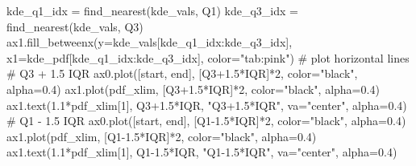 \documentclass[
  letterpaper,
  DIV=11,
  numbers=noendperiod,
  oneside]{scrreprt}
\newenvironment{Shaded}{\begin{snugshade}}{\end{snugshade}}
\newcommand{\CommentTok}[1]{\textcolor[rgb]{0.37,0.37,0.37}{#1}}
\newcommand{\DecValTok}[1]{\textcolor[rgb]{0.68,0.00,0.00}{#1}}
\newcommand{\FloatTok}[1]{\textcolor[rgb]{0.68,0.00,0.00}{#1}}
\newcommand{\NormalTok}[1]{\textcolor[rgb]{0.00,0.23,0.31}{#1}}
\newcommand{\OperatorTok}[1]{\textcolor[rgb]{0.37,0.37,0.37}{#1}}
\newcommand{\StringTok}[1]{\textcolor[rgb]{0.13,0.47,0.30}{#1}}
\begin{document}
\begin{Shaded}
\begin{Highlighting}[]
\NormalTok{kde\_q1\_idx }\OperatorTok{=}\NormalTok{ find\_nearest(kde\_vals, Q1)}
\NormalTok{kde\_q3\_idx }\OperatorTok{=}\NormalTok{ find\_nearest(kde\_vals, Q3)}
\NormalTok{ax1.fill\_betweenx(y}\OperatorTok{=}\NormalTok{kde\_vals[kde\_q1\_idx:kde\_q3\_idx],}
\NormalTok{                  x1}\OperatorTok{=}\NormalTok{kde\_pdf[kde\_q1\_idx:kde\_q3\_idx],}
\NormalTok{                  color}\OperatorTok{=}\StringTok{"tab:pink"}\NormalTok{)}
\CommentTok{\# plot horizontal lines}
\CommentTok{\# Q3 + 1.5 IQR}
\NormalTok{ax0.plot([start, end], [Q3}\OperatorTok{+}\FloatTok{1.5}\OperatorTok{*}\NormalTok{IQR]}\OperatorTok{*}\DecValTok{2}\NormalTok{, color}\OperatorTok{=}\StringTok{"black"}\NormalTok{, alpha}\OperatorTok{=}\FloatTok{0.4}\NormalTok{)}
\NormalTok{ax1.plot(pdf\_xlim, [Q3}\OperatorTok{+}\FloatTok{1.5}\OperatorTok{*}\NormalTok{IQR]}\OperatorTok{*}\DecValTok{2}\NormalTok{, color}\OperatorTok{=}\StringTok{"black"}\NormalTok{, alpha}\OperatorTok{=}\FloatTok{0.4}\NormalTok{)}
\NormalTok{ax1.text(}\FloatTok{1.1}\OperatorTok{*}\NormalTok{pdf\_xlim[}\DecValTok{1}\NormalTok{], Q3}\OperatorTok{+}\FloatTok{1.5}\OperatorTok{*}\NormalTok{IQR, }\StringTok{"Q3+1.5*IQR"}\NormalTok{, va}\OperatorTok{=}\StringTok{"center"}\NormalTok{, alpha}\OperatorTok{=}\FloatTok{0.4}\NormalTok{)}
\CommentTok{\# Q1 {-} 1.5 IQR}
\NormalTok{ax0.plot([start, end], [Q1}\OperatorTok{{-}}\FloatTok{1.5}\OperatorTok{*}\NormalTok{IQR]}\OperatorTok{*}\DecValTok{2}\NormalTok{, color}\OperatorTok{=}\StringTok{"black"}\NormalTok{, alpha}\OperatorTok{=}\FloatTok{0.4}\NormalTok{)}
\NormalTok{ax1.plot(pdf\_xlim, [Q1}\OperatorTok{{-}}\FloatTok{1.5}\OperatorTok{*}\NormalTok{IQR]}\OperatorTok{*}\DecValTok{2}\NormalTok{, color}\OperatorTok{=}\StringTok{"black"}\NormalTok{, alpha}\OperatorTok{=}\FloatTok{0.4}\NormalTok{)}
\NormalTok{ax1.text(}\FloatTok{1.1}\OperatorTok{*}\NormalTok{pdf\_xlim[}\DecValTok{1}\NormalTok{], Q1}\OperatorTok{{-}}\FloatTok{1.5}\OperatorTok{*}\NormalTok{IQR, }\StringTok{"Q1{-}1.5*IQR"}\NormalTok{, va}\OperatorTok{=}\StringTok{"center"}\NormalTok{, alpha}\OperatorTok{=}\FloatTok{0.4}\NormalTok{)}


\end{Highlighting}
\end{Shaded}
\end{document}
